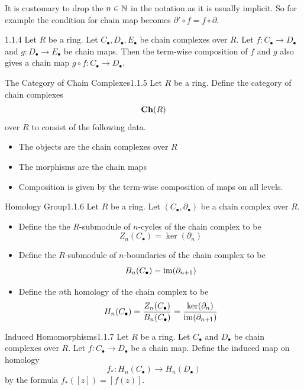 \documentclass[a4paper]{article}
\begin{document}
It is customary to drop the $n\in\mathbb{N}$ in the notation as it is usually implicit. So for example the condition for chain map becomes $\partial'\circ f=f\circ\partial$. 

\begin{lmm}{}{1.1.4} Let $R$ be a ring. Let $C_\bullet,D_\bullet,E_\bullet$ be chain complexes over $R$. Let $f:C_\bullet\to D_\bullet$ and $g:D_\bullet\to E_\bullet$ be chain maps. Then the term-wise composition of $f$ and $g$ also gives a chain map $g\circ f:C_\bullet\to D_\bullet$. 
\end{lmm}

\begin{defn}{The Category of Chain Complexes}{1.1.5} Let $R$ be a ring. Define the category of chain complexes $$\bold{Ch}(R)$$ over $R$ to consist of the following data. 
\begin{itemize}
\item The objects are the chain complexes over $R$
\item The morphisms are the chain maps
\item Composition is given by the term-wise composition of maps on all levels. 
\end{itemize}
\end{defn}

\begin{defn}{Homology Group}{1.1.6} Let $R$ be a ring. Let $(C_\bullet,\partial_\bullet)$ be a chain complex over $R$. 
\begin{itemize}
\item Define the the $R$-submodule of $n$-cycles of the chain complex to be $$Z_n(C_\bullet)=\ker(\partial_n)$$
\item Define the $R$-submodule of $n$-boundaries of the chain complex to be $$B_n(C_\bullet)=\operatorname{im}(\partial_{n+1})$$
\item Define the $n$th homology of the chain complex to be $$H_n(C_\bullet)=\frac{Z_n(C_\bullet)}{B_n(C_\bullet)}=\frac{\ker(\partial_n)}{\operatorname{im}(\partial_{n+1})}$$
\end{itemize}
\end{defn}

\begin{defn}{Induced Homomorphisms}{1.1.7} Let $R$ be a ring. Let $C_\bullet$ and $D_\bullet$ be chain complexes over $R$. Let $f:C_\bullet\to D_\bullet$ be a chain map. Define the induced map on homology $$f_\ast:H_n(C_\bullet)\to H_n(D_\bullet)$$ by the formula $f_\ast([z])=[f(z)]$. 
\end{defn}
\end{document}
